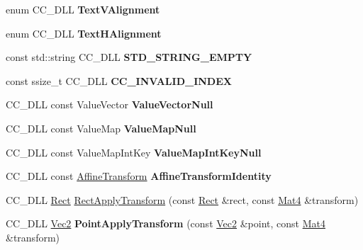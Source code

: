 \begin{DoxyCompactItemize}
\item 
\mbox{\label{group__base_ga4b95188c59c9adaba2929c784776110c}} 
enum C\+C\+\_\+\+D\+LL {\bfseries Text\+V\+Alignment}
\item 
\mbox{\label{group__base_gae13152ef574120d225b26dc47704ab22}} 
enum C\+C\+\_\+\+D\+LL {\bfseries Text\+H\+Alignment}
\item 
\mbox{\label{group__base_ga3948910b23b18f4175e7ed8ad42f7d5c}} 
const std\+::string C\+C\+\_\+\+D\+LL {\bfseries S\+T\+D\+\_\+\+S\+T\+R\+I\+N\+G\+\_\+\+E\+M\+P\+TY}
\item 
\mbox{\label{group__base_gaf6d0a4ec9f66c0f6a6cb80808f21a9a3}} 
const ssize\+\_\+t C\+C\+\_\+\+D\+LL {\bfseries C\+C\+\_\+\+I\+N\+V\+A\+L\+I\+D\+\_\+\+I\+N\+D\+EX}
\item 
\mbox{\label{group__base_ga5ea7e67358375e99654c5bfb9fc3f8c7}} 
C\+C\+\_\+\+D\+LL const Value\+Vector {\bfseries Value\+Vector\+Null}
\item 
\mbox{\label{group__base_ga8cee7c42f024c9ccc0c9dcc86c8c450e}} 
C\+C\+\_\+\+D\+LL const Value\+Map {\bfseries Value\+Map\+Null}
\item 
\mbox{\label{group__base_gaa515868a12cbd458cc3a1c239a31e70d}} 
C\+C\+\_\+\+D\+LL const Value\+Map\+Int\+Key {\bfseries Value\+Map\+Int\+Key\+Null}
\item 
\mbox{\label{group__base_ga3ea037ccb8f82eff2b09582e9f5125f4}} 
C\+C\+\_\+\+D\+LL const \hyperlink{structAffineTransform}{Affine\+Transform} {\bfseries Affine\+Transform\+Identity}
\end{DoxyCompactItemize}
\begin{DoxyCompactItemize}
\item 
C\+C\+\_\+\+D\+LL \hyperlink{classRect}{Rect} \hyperlink{group__base_ga44db1250c00eeefdf29f56f8121b1301}{Rect\+Apply\+Transform} (const \hyperlink{classRect}{Rect} \&rect, const \hyperlink{classMat4}{Mat4} \&transform)
\item 
\mbox{\label{group__base_gaa58c223b16a62186a75e222c37033dc1}} 
C\+C\+\_\+\+D\+LL \hyperlink{classVec2}{Vec2} {\bfseries Point\+Apply\+Transform} (const \hyperlink{classVec2}{Vec2} \&point, const \hyperlink{classMat4}{Mat4} \&transform)
\end{DoxyCompactItemize}
